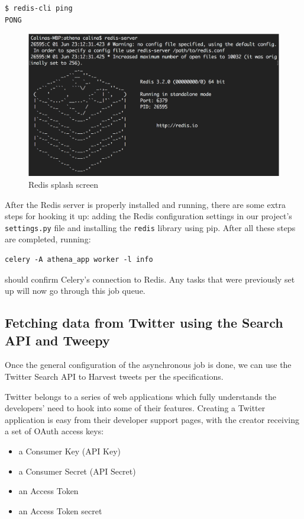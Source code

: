 \documentclass[12pt,a4paper,twoside]{report}
\begin{document}
\lstset{basicstyle=\small}
\begin{lstlisting}
$ redis-cli ping
PONG
\end{lstlisting}

\begin{figure}[ht]
    \centering
\includegraphics[width=0.8\columnwidth]{img/redis-splash.png}
    \caption{Redis splash screen}
    \label{fig:redis}
\end{figure}

After the Redis server is properly installed and running, there are some extra steps for hooking it up: adding the Redis configuration settings in our project's \texttt{settings.py} file and installing the \texttt{redis} library using pip. After all these steps are completed, running:

\lstset{basicstyle=\small}
\begin{lstlisting}
celery -A athena_app worker -l info
\end{lstlisting}

should confirm Celery's connection to Redis. Any tasks that were previously set up will now go through this job queue.

\subsection{Fetching data from Twitter using the Search API and Tweepy}
Once the general configuration of the asynchronous job is done, we can use the Twitter Search API to Harvest tweets per the specifications.

Twitter belongs to a series of web applications which fully understands the developers' need to hook into some of their features. Creating a Twitter application is easy from their developer support pages, with the creator receiving a set of OAuth access keys:

\begin{itemize}
\item a Consumer Key (API Key)
\item a Consumer Secret (API Secret)
\item an Access Token
\item an Access Token secret
\end{itemize}
\end{document}
